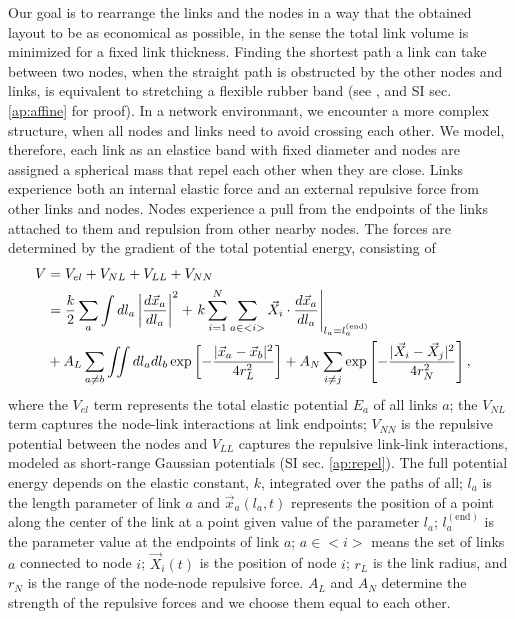 \documentclass[nofootinbib,preprint,floatfix,titlepage,endfloats]{revtex4} %
\begin{document}
Our goal is to rearrange the links and the nodes in a way that 
the obtained layout to be as economical as possible, in the sense the total link volume is minimized for a fixed link thickness. 
Finding the shortest path a link can take between two nodes, when the straight path is obstructed by the other nodes and links, is equivalent to stretching a flexible rubber band (see \cite{novikov1984}, and SI sec. \ref{ap:affine} for proof).
In a network environmant, we encounter a more complex structure, when all nodes and links need to avoid crossing each other.
We model, therefore, each link as an elastice band with fixed diameter and %
nodes are assigned a spherical mass that repel each other when they are close. 
Links experience both an internal elastic force and an external repulsive force from other links and nodes. 
Nodes experience a pull from the endpoints of the links attached to them and repulsion from other nearby nodes. 
The forces are determined by the gradient of the total potential energy, consisting of 
\begin{align}
    V &= V_{el} + V_{NL} + V_{LL} +V_{NN} \cr 
    &= {k\over 2}\sum_a\int dl_a \left|{d\vec{x}_a\over dl_a} \right|^2 + 
    \left. k\sum_{i=1}^N  \sum_{a\in <i>}  \vec{X}_i \cdot{d\vec{x}_a%
    \over dl_a}\right|_{l_a = l^{(\mathrm{end})}_a}
    \cr
    &+A_L\sum_{a\ne b} \iint dl_adl_b 
    \exp\left[- {|\vec{x}_a-\vec{x}_b|^2 \over 4 r_L^2}\right] + A_N\sum_{i\ne j}  \exp\left[- {|\vec{X}_i-\vec{X}_j|^2 \over 4r_N^2}\right],
 \label{eq:Vfull}
\end{align}
where the $V_{el}$ term represents the total elastic potential $E_a$ of all links $a$; the $V_{NL}$ term
captures the node-link interactions at link endpoints;
 $V_{NN}$  is the repulsive potential between the nodes and  $V_{LL}$ captures the repulsive link-link interactions, modeled as short-range Gaussian potentials (SI sec. \ref{ap:repel}). 
The full potential energy depends on the elastic constant, $k$, integrated over the paths of all; $l_a$ is the length parameter of link $a$ and  $\vec{x}_a(l_a,t)$ represents the position of a point along the center of the link at a point given value of the parameter $l_a$; $l_a^\mathrm{(end)}$ is the parameter value at the endpoints of link $a$; $a\in <i>$ means the set of links $a$ connected to node $i$; $\vec{X}_i(t)$ is the position of node $i$; $r_L$ is the link radius, and $r_N$ is the range of the node-node repulsive force. $A_L$ and $A_N$ determine the strength of the repulsive forces and we choose them equal to each other.   
\end{document}
